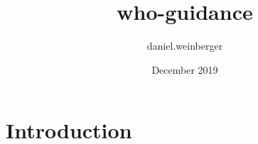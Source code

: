 \documentclass{article}
\title{who-guidance}
\author{daniel.weinberger }
\date{December 2019}
\begin{document}
\maketitle

\section{Introduction}
\end{document}
